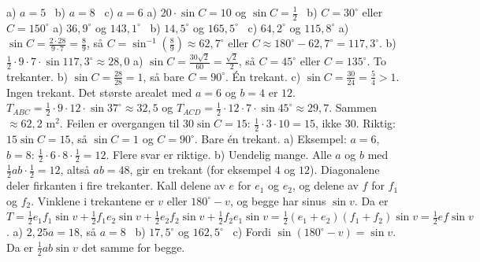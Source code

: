  a) $a = 5$ \ b) $a = 8$ \ c) $a = 6$
 a) $20 \cdot \sin C = 10$ og $\sin C = \frac12$ \ b) $C = 30^\circ$ eller $C = 150^\circ$
 a) $36{,}9^\circ$ og $143{,}1^\circ$ \ b) $14{,}5^\circ$ og $165{,}5^\circ$ \ c) $64{,}2^\circ$ og $115{,}8^\circ$
 a) $\sin C = \frac{2\cdot 28}{9\cdot 7} = \frac89$, så $C = \sin^{-1}\!\left(\frac89\right) \approx 62{,}7^\circ$ eller $C \approx 180^\circ - 62{,}7^\circ = 117{,}3^\circ$.
b) $\frac12 \cdot 9 \cdot 7 \cdot \sin 117{,}3^\circ \approx 28{,}0$
 a) $\sin C = \frac{30\sqrt2}{60} = \frac{\sqrt2}{2}$, så $C = 45^\circ$ eller $C = 135^\circ$. To trekanter.
b) $\sin C = \frac{28}{28} = 1$, så bare $C = 90^\circ$. Én trekant.
c) $\sin C = \frac{30}{24} = \frac54 > 1$. Ingen trekant. Det største arealet med $a = 6$ og $b = 4$ er $12$.
 $T_{ABC} = \frac12 \cdot 9 \cdot 12 \cdot \sin 37^\circ \approx 32{,}5$ og $T_{ACD} = \frac12 \cdot 12 \cdot 7 \cdot \sin 45^\circ \approx 29{,}7$. Sammen $\approx 62{,}2$ m$^2$.
 Feilen er overgangen til $30\sin C = 15$: $\frac12 \cdot 3 \cdot 10 = 15$, ikke $30$. Riktig: $15\sin C = 15$, så $\sin C = 1$ og $C = 90^\circ$. Bare én trekant.
 a) Eksempel: $a = 6$, $b = 8$: $\frac12 \cdot 6 \cdot 8 \cdot \frac12 = 12$. Flere svar er riktige.
b) Uendelig mange. Alle $a$ og $b$ med $\frac12 ab \cdot \frac12 = 12$, altså $ab = 48$, gir en trekant (for eksempel $4$ og $12$).
 Diagonalene deler firkanten i fire trekanter. Kall delene av $e$ for $e_1$ og $e_2$, og delene av $f$ for $f_1$ og $f_2$. Vinklene i trekantene er $v$ eller $180^\circ - v$, og begge har sinus $\sin v$. Da er
$T = \frac12 e_1f_1\sin v + \frac12 f_1e_2\sin v + \frac12 e_2f_2\sin v + \frac12 f_2e_1\sin v = \frac12 (e_1+e_2)(f_1+f_2)\sin v = \frac12 ef\sin v$.
 a) $2{,}25a = 18$, så $a = 8$ \ b) $17{,}5^\circ$ og $162{,}5^\circ$ \ c) Fordi $\sin(180^\circ - v) = \sin v$. Da er $\frac12 ab\sin v$ det samme for begge.

